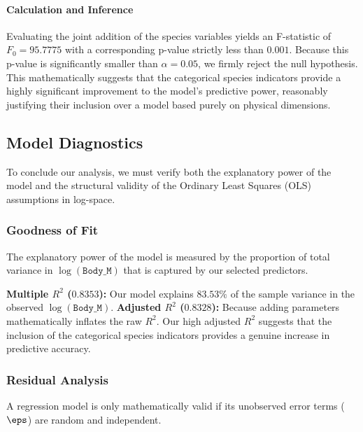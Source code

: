 \documentclass[12pt]{article}
\begin{document}
\paragraph{Calculation and Inference}
Evaluating the joint addition of the species variables
yields an F-statistic of $F_0 = 95.7775$ with a
corresponding p-value strictly less than $0.001$.
Because this p-value is significantly
smaller than $\alpha = 0.05$, we firmly reject the null
hypothesis. This mathematically suggests that the categorical
species indicators provide a highly significant improvement
to the model's predictive power, reasonably justifying their
inclusion over a model based purely on physical dimensions.

\subsection{Model Diagnostics}
\label{subsection:goodness_of_fit}

To conclude our analysis, we must verify both the
explanatory power of the model and the structural validity
of the Ordinary Least Squares (OLS) assumptions in log-space.

\subsubsection{Goodness of Fit}
The explanatory power of the model is measured by the
proportion of total variance in $\log(\texttt{Body\_M})$ that is
captured by our selected predictors.
\begin{itemize}
    \ii \textbf{Multiple $R^2$ ($0.8353$):} Our model explains
    $83.53\%$ of the sample variance in the observed
    $\log(\texttt{Body\_M})$.
    \ii \textbf{Adjusted $R^2$ ($0.8328$):} Because adding
    parameters mathematically inflates the raw $R^2$. Our high
    adjusted $R^2$ suggests that the inclusion of the categorical
    species indicators provides a genuine increase in predictive
    accuracy.
\end{itemize}

\subsubsection{Residual Analysis}
A regression model is only mathematically valid if its
unobserved error terms ($\eps$) are random
and independent.
\end{document}
